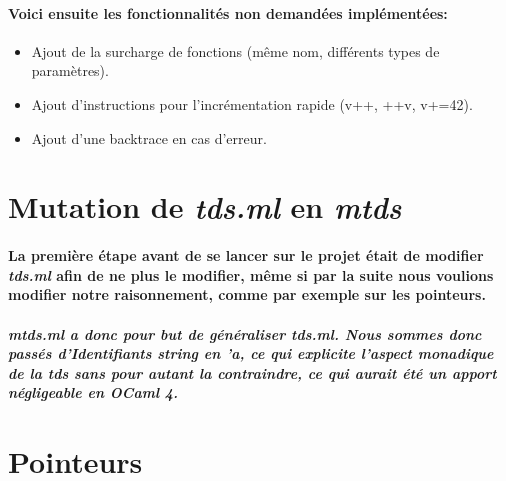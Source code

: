 \documentclass[french]{article}
\begin{document}
\paragraph{Voici ensuite les fonctionnalités non demandées implémentées:}
\begin{itemize}
        \item Ajout de la surcharge de fonctions (même nom, différents types de paramètres).
        \item Ajout d'instructions pour l'incrémentation rapide (v++, ++v, v+=42).
        \item Ajout d'une backtrace en cas d'erreur.
\end{itemize}
\section{Mutation de \emph{tds.ml} en \emph{mtds}}
\paragraph*{La première étape avant de se lancer sur le projet était de modifier \emph{tds.ml} afin de ne plus le modifier,
même si par la suite nous voulions modifier notre raisonnement, comme par exemple sur les pointeurs.}
\subparagraph*{\emph{mtds.ml} a donc pour but de généraliser \emph{tds.ml}. Nous sommes donc passés d'Identifiants \emph{string}
en \emph{'a}, ce qui explicite l'aspect monadique de la tds sans pour autant la contraindre, ce qui aurait été un apport négligeable en OCaml 4.}

\section{Pointeurs}
\end{document}
